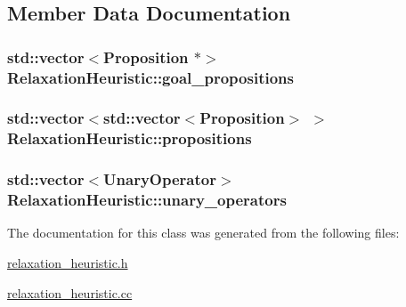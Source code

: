 \subsection{Member Data Documentation}
\hypertarget{classRelaxationHeuristic_a0d1cf8a6bc1f7fff5821cfe40458bc53}{
\subsubsection[{goal\-\_\-propositions}]{\setlength{\rightskip}{0pt plus 5cm}std\-::vector$<${\bf Proposition} $\ast$$>$ Relaxation\-Heuristic\-::goal\-\_\-propositions\hspace{0.3cm}{\ttfamily [protected]}}}\label{classRelaxationHeuristic_a0d1cf8a6bc1f7fff5821cfe40458bc53}
\hypertarget{classRelaxationHeuristic_af14ac5ca803abbcad071fd0a84d1ea7b}{
\subsubsection[{propositions}]{\setlength{\rightskip}{0pt plus 5cm}std\-::vector$<$std\-::vector$<${\bf Proposition}$>$ $>$ Relaxation\-Heuristic\-::propositions\hspace{0.3cm}{\ttfamily [protected]}}}\label{classRelaxationHeuristic_af14ac5ca803abbcad071fd0a84d1ea7b}
\hypertarget{classRelaxationHeuristic_a9e94cfa3f8d37fe029b2ac1df7fb6d39}{
\subsubsection[{unary\-\_\-operators}]{\setlength{\rightskip}{0pt plus 5cm}std\-::vector$<${\bf Unary\-Operator}$>$ Relaxation\-Heuristic\-::unary\-\_\-operators\hspace{0.3cm}{\ttfamily [protected]}}}\label{classRelaxationHeuristic_a9e94cfa3f8d37fe029b2ac1df7fb6d39}


The documentation for this class was generated from the following files\-:\begin{DoxyCompactItemize}
\item 
\hyperlink{relaxation__heuristic_8h}{relaxation\-\_\-heuristic.\-h}\item 
\hyperlink{relaxation__heuristic_8cc}{relaxation\-\_\-heuristic.\-cc}\end{DoxyCompactItemize}

